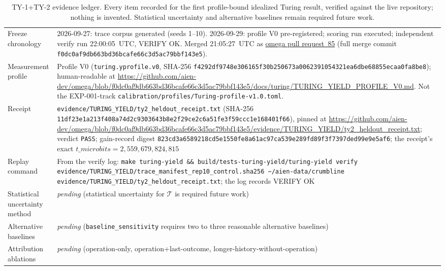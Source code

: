 \documentclass[11pt]{article}
\begin{document}
\begin{table}[h]
\begin{tabularx}{\textwidth}{lY}
Freeze chronology & 2026-09-27: trace corpus generated (seeds 1--10). 2026-09-29: profile V0 pre-registered; scoring run executed; independent verify run 22:00:05~UTC, VERIFY OK. Merged 21:05:27~UTC as \href{https://github.com/aien-dev/omega/pull/85}{omega pull request~85} (full merge commit \texttt{f0dc0af9db663bd36bcafe66c3d5ac79bbf143e5}). \\
Measurement profile & Profile V0 (\texttt{turing.yprofile.v0}, SHA-256 \texttt{f4292df9748e306165f30b250673a0062391054321ea6dbe68855ecaa0fa8be8}); human-readable at \url{https://github.com/aien-dev/omega/blob/f0dc0af9db663bd36bcafe66c3d5ac79bbf143e5/docs/turing/TURING_YIELD_PROFILE_V0.md}. Not the EXP-001-track \texttt{calibration/profiles/Turing-profile-v1.0.toml}. \\
Receipt & \texttt{evidence/TURING\_YIELD/ty2\_heldout\_receipt.txt} (SHA-256 \texttt{11df23e1a213f408a74d2c9303643b8e2f29ce2c6a51fe3f59ccc1e168401f66}), pinned at \url{https://github.com/aien-dev/omega/blob/f0dc0af9db663bd36bcafe66c3d5ac79bbf143e5/evidence/TURING_YIELD/ty2_heldout_receipt.txt}; verdict \texttt{PASS}; gain-record digest \texttt{823cd3a6589218cd5e1550fe8a61ac97ca539e289fd89f3f7397ded99e9e5af6}; the receipt's exact \(t\_microbits = 2{,}559{,}679{,}824{,}815\) \\
Replay command & From the verify log: \texttt{make turing-yield \&\& build/tests-turing-yield/turing-yield verify evidence/TURING\_YIELD/trace\_manifest\_rep10\_control.sha256 \textasciitilde/aien-data/crumbline evidence/TURING\_YIELD/ty2\_heldout\_receipt.txt}; the log records VERIFY OK \\
Statistical uncertainty method & \textit{pending} (statistical uncertainty for \(\mathcal{T}\) is required future work) \\
Alternative baselines & \textit{pending} (\texttt{baseline\_sensitivity} requires two to three reasonable alternative baselines) \\
Attribution ablations & \textit{pending} (operation-only, operation+last-outcome, longer-history-without-operation) \\
\bottomrule
\end{tabularx}
\caption{TY-1+TY-2 evidence ledger. Every item recorded for the first profile-bound idealized Turing result, verified against the live repository; nothing is invented. Statistical uncertainty and alternative baselines remain required future work.}
\end{table}
\end{document}
